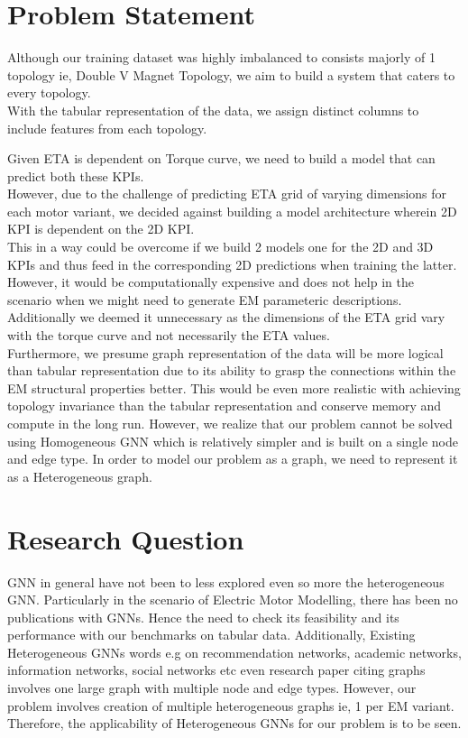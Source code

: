 \documentclass{report} %
\begin{document}
\section{Problem Statement}\label{sec:Problem Statement}

Although our training dataset was highly imbalanced to consists majorly of 1 topology ie, Double V Magnet Topology, we aim to build a system that caters to every topology. \\
With the tabular representation of the data, we assign distinct columns to include features from each topology.

Given ETA is dependent on Torque curve, we need to build a model that can predict both these KPIs.\\
However, due to the challenge of predicting ETA grid of varying dimensions for each motor variant, we decided against building a model architecture wherein 2D KPI is dependent on the 2D KPI. \\
This in a way could be overcome if we build 2 models one for the 2D and 3D KPIs and thus feed in the corresponding 2D predictions when training the latter. \\
However, it would be computationally expensive and does not help in the scenario when we might need to generate \ac{EM} parameteric descriptions.
Additionally we deemed it unnecessary as the dimensions of the ETA grid vary with the torque curve and not necessarily the ETA values. \\

Furthermore, we presume graph representation of the data will be more logical than tabular representation due to its ability to grasp the connections within the \ac{EM} structural properties better.
This would be even more realistic with achieving topology invariance than the tabular representation and conserve memory and compute in the long run.
However, we realize that our problem cannot be solved using Homogeneous \ac{GNN} which is relatively simpler and is built on a single node and edge type.
In order to model our problem as a graph, we need to represent it as a Heterogeneous graph. \\

\section{Research Question}\label{sec:Research Question}
\ac{GNN} in general have not been to less explored even so more the heterogeneous \ac{GNN}.
Particularly in the scenario of Electric Motor Modelling, there has been no publications with \ac{GNN}s.
Hence the need to check its feasibility and its performance with our benchmarks on tabular data.
Additionally, Existing Heterogeneous \ac{GNN}s words e.g on recommendation networks, academic networks, information networks, social networks etc even research paper citing graphs involves one large graph with multiple node and edge types. 
However, our problem involves creation of multiple heterogeneous graphs ie, 1 per \ac{EM} variant.\\
Therefore, the applicability of Heterogeneous \ac{GNN}s for our problem is to be seen.\\
\end{document}
